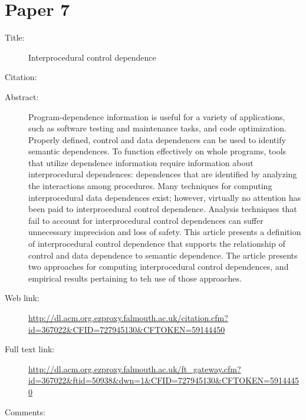 \documentclass{scrartcl}
\begin{document}
\section*{Paper 7}
\begin{description}
\item[Title:]Interprocedural control dependence
\item[Citation:] \cite{sinha2001interprocedural}
\item[Abstract:] Program-dependence information is useful for a variety of applications, such as software testing and maintenance tasks, and code optimization. Properly defined, control and data dependences can be used to identify semantic dependences. To function effectively on whole programs, tools that utilize dependence information require information about interprocedural dependences: dependences that are identified by analyzing the interactions among procedures. Many techniques for computing interprocedural data dependences exist; however, virtually no attention has been paid to interprocedural control dependence. Analysis techniques that fail to account for interprocedural control dependences can suffer unnecessary imprecision and loss of safety. This article presents a definition of interprocedural control dependence that supports the relationship of control and data dependence to semantic dependence. The article presents two approaches for computing interprocedural control dependences, and empirical results pertaining to teh use of those approaches.
\item[Web link:]\url  {http://dl.acm.org.ezproxy.falmouth.ac.uk/citation.cfm?id=367022&CFID=727945130&CFTOKEN=59144450}
\item[Full text link:]\url { http://dl.acm.org.ezproxy.falmouth.ac.uk/ft_gateway.cfm?id=367022&ftid=50938&dwn=1&CFID=727945130&CFTOKEN=59144450}
\item[Comments:] 
\end{description}
\end{document}
